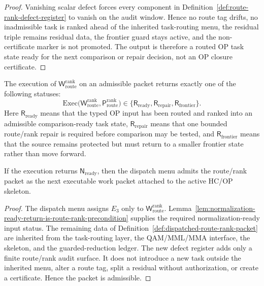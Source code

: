 \begin{proof}
Vanishing scalar defect forces every component in Definition~\ref{def:route-rank-defect-register} to vanish on the audit window. Hence no route tag drifts, no inadmissible task is ranked ahead of the inherited task-routing menu, the residual triple remains residual data, the frontier guard stays active, and the non-certificate marker is not promoted. The output is therefore a routed OP task state ready for the next comparison or repair decision, not an OP closure certificate.
\end{proof}

\begin{definition}
\label{def:r19-route-rank-return}
The execution of \(\mathsf W_{\mathrm{route}}^{\mathrm{rank}}\) on an admissible packet returns exactly one of the following statuses:
\[
\mathrm{Exec}\bigl(\mathsf W_{\mathrm{route}}^{\mathrm{rank}},
 \mathsf P_{\mathrm{route}}^{\mathrm{rank}}\bigr)
\in
\{\mathsf R_{\mathrm{ready}},\mathsf R_{\mathrm{repair}},\mathsf R_{\mathrm{frontier}}\}.
\]
Here \(\mathsf R_{\mathrm{ready}}\) means that the typed OP input has been routed and ranked into an admissible comparison-ready task state, \(\mathsf R_{\mathrm{repair}}\) means that one bounded route/rank repair is required before comparison may be tested, and \(\mathsf R_{\mathrm{frontier}}\) means that the source remains protected but must return to a smaller frontier state rather than move forward.
\end{definition}

\begin{proposition}
\label{prop:dispatched-route-rank-packet-admissible}
If the execution returns \(\mathsf N_{\mathrm{ready}}\), then the dispatch menu admits the route/rank packet as the next executable work packet attached to the active HC/OP skeleton.
\end{proposition}

\begin{proof}
The dispatch menu assigns \(E_3\) only to \(\mathsf W_{\mathrm{route}}^{\mathrm{rank}}\). Lemma~\ref{lem:normalization-ready-return-is-route-rank-precondition} supplies the required normalization-ready input status. The remaining data of Definition~\ref{def:dispatched-route-rank-packet} are inherited from the task-routing layer, the QAM/MML/MMA interface, the skeleton, and the guarded-reduction ledger. The new defect register adds only a finite route/rank audit surface. It does not introduce a new task outside the inherited menu, alter a route tag, split a residual without authorization, or create a certificate. Hence the packet is admissible.
\end{proof}

